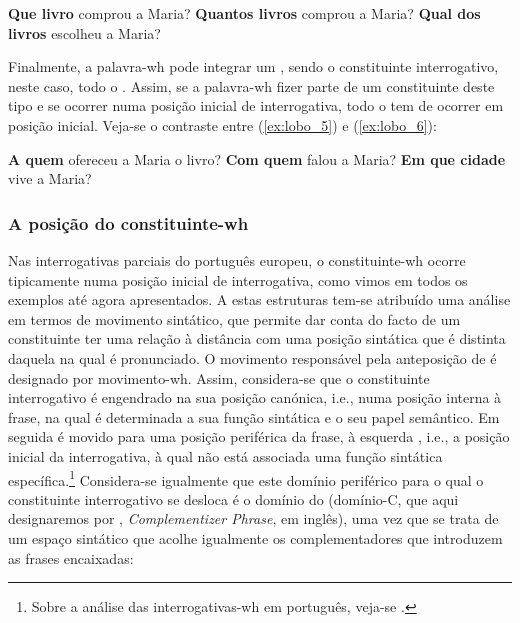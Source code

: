 \documentclass[output=paper]{LSP/langsci}
\begin{document}
\ea\label{ex:lobo_4}
\ea\label{ex:lobo_4a} \textbf{Que livro} comprou a Maria?
\ex\label{ex:lobo_4b} \textbf{Quantos livros} comprou a Maria?
\ex\label{ex:lobo_4c} \textbf{Qual dos livros} escolheu a Maria?
\zl

Finalmente, a palavra-wh pode integrar um , sendo o constituinte interrogativo, neste caso, todo o . Assim, se a palavra-wh fizer parte de um constituinte deste tipo e se ocorrer numa posição inicial de interrogativa, todo o  tem de ocorrer em posição inicial. Veja-se o contraste entre (\ref{ex:lobo_5}) e (\ref{ex:lobo_6}):

\ea\label{ex:lobo_5}
\ea\label{ex:lobo_5a} \textbf{A quem} ofereceu a Maria o livro?
\ex\label{ex:lobo_5b} \textbf{Com quem} falou a Maria?
\ex\label{ex:lobo_5c} \textbf{Em que cidade} vive a Maria?
\zl

\ea\label{ex:lobo_6}
\zl
\subsubsection{A posição do constituinte-wh}
\label{subsubsec:lobo_posicao_wh}

Nas interrogativas parciais do português europeu, o constituinte-wh ocorre tipicamente numa posição inicial de interrogativa, como vimos em todos os exemplos até agora apresentados. A estas estruturas tem-se atribuído uma análise em termos de movimento sintático, que permite dar conta do facto de um constituinte ter uma relação à distância com uma posição sintática que é distinta daquela na qual é pronunciado. O movimento responsável pela anteposição de  é designado por movimento-wh. Assim, considera-se que o constituinte interrogativo é engendrado na sua posição canónica, i.e., numa posição interna à frase, na qual é determinada a sua função sintática e o seu papel semântico. Em seguida é movido para uma posição periférica da frase, à esquerda \citep{bresnan1970,chomsky1986,ambar1988}, i.e., a posição inicial da interrogativa, à qual não está associada uma função sintática específica.\footnote{Sobre a análise das interrogativas-wh em português, veja-se \citet{mateus_etal2003,ambar1988,ambar2003,duarte2000,soares2006}.} Considera-se igualmente que este domínio periférico para o qual o constituinte interrogativo se desloca é o domínio do  (domínio-C, que aqui designaremos por , \textit{Complementizer Phrase}, em inglês), uma vez que se trata de um espaço sintático que acolhe igualmente os complementadores que introduzem as frases encaixadas:
\end{document}
